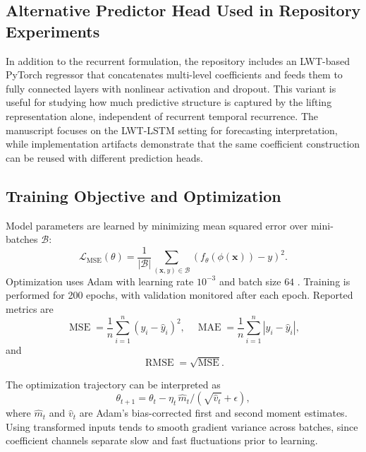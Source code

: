 \documentclass[journal]{IEEEtran}
\begin{document}
\subsection{Alternative Predictor Head Used in Repository Experiments}
In addition to the recurrent formulation, the repository includes an LWT-based PyTorch regressor that concatenates multi-level coefficients and feeds them to fully connected layers with nonlinear activation and dropout. This variant is useful for studying how much predictive structure is captured by the lifting representation alone, independent of recurrent temporal recurrence. The manuscript focuses on the LWT-LSTM setting for forecasting interpretation, while implementation artifacts demonstrate that the same coefficient construction can be reused with different prediction heads.

\subsection{Training Objective and Optimization}
Model parameters are learned by minimizing mean squared error over mini-batches $\mathcal{B}$:
\begin{equation}
\mathcal{L}_{\text{MSE}}(\theta)=\frac{1}{|\mathcal{B}|}\sum_{(\mathbf{x},y)\in\mathcal{B}}
\left(f_{\theta}(\phi(\mathbf{x}))-y\right)^2.
\end{equation}
Optimization uses Adam with learning rate $10^{-3}$ and batch size $64$ \cite{kingma2015adam}. Training is performed for 200 epochs, with validation monitored after each epoch. Reported metrics are
\begin{equation}
\operatorname{MSE}=\frac{1}{n}\sum_{i=1}^{n}(y_i-\hat{y}_i)^2,
\quad
\operatorname{MAE}=\frac{1}{n}\sum_{i=1}^{n}|y_i-\hat{y}_i|,
\end{equation}
and
\begin{equation}
\operatorname{RMSE}=\sqrt{\operatorname{MSE}}.
\end{equation}

The optimization trajectory can be interpreted as
\begin{equation}
\theta_{t+1}=\theta_t-\eta_t\,\hat{m}_t/(\sqrt{\hat{v}_t}+\epsilon),
\end{equation}
where $\hat{m}_t$ and $\hat{v}_t$ are Adam's bias-corrected first and second moment estimates. Using transformed inputs tends to smooth gradient variance across batches, since coefficient channels separate slow and fast fluctuations prior to learning.
\end{document}
